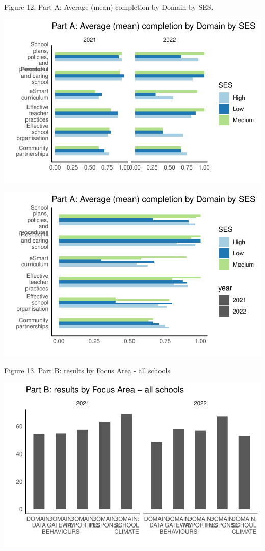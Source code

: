 \documentclass[
  letterpaper,
  DIV=11,
  numbers=noendperiod]{scrartcl}
\begin{document}
Figure 12. Part A: Average (mean) completion by Domain by SES.

\includegraphics{report_files/figure-pdf/unnamed-chunk-14-1.pdf}

\includegraphics{report_files/figure-pdf/unnamed-chunk-14-2.pdf}

Figure 13. Part B: results by Focus Area - all schools

\includegraphics{report_files/figure-pdf/unnamed-chunk-15-1.pdf}
\end{document}
